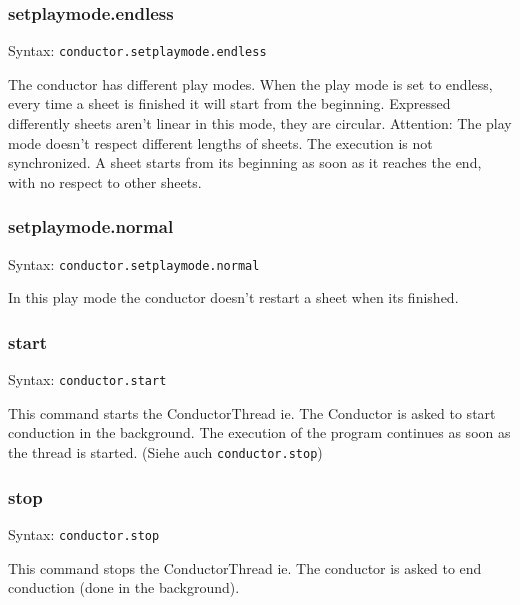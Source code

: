 \documentclass[10pt,a4paper]{article}
\begin{document}
\subsubsection{setplaymode.endless}
Syntax: \lstinline|conductor.setplaymode.endless|

The conductor has different play modes. When the play mode is set to endless,
every time a sheet is finished it will start from the beginning. Expressed
differently sheets aren't linear in this mode, they are circular. 
Attention: The play mode doesn't respect different lengths of sheets. The 
execution is not synchronized. A sheet starts from its beginning as soon as it
reaches the end, with no respect to other sheets. 

\subsubsection{setplaymode.normal}
Syntax: \lstinline|conductor.setplaymode.normal|

In this play mode the conductor doesn't restart a sheet when its finished. 
\subsubsection{start}
Syntax: \lstinline|conductor.start|

This command starts the ConductorThread ie. The Conductor is asked to start
conduction in the background. The execution of the program continues as soon
as the thread is started. 
(Siehe auch \lstinline|conductor.stop|)
\subsubsection{stop}
Syntax: \lstinline|conductor.stop|

This command stops the ConductorThread ie. The conductor is asked to end 
conduction (done in the background). 
\end{document}
